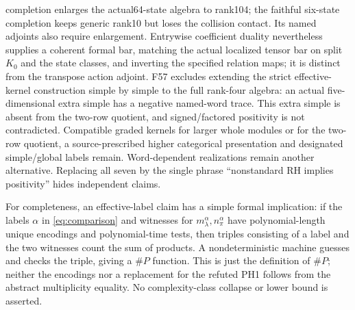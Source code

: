 \documentclass[11pt,a4paper]{article}
\theoremstyle{named}\newtheorem{finding}{Finding}[section]
\theoremstyle{definition}\newtheorem{definition}[finding]{Definition}
\theoremstyle{remark}\newtheorem{remark}[finding]{Remark}
\begin{document}
completion enlarges the actual64-state algebra to rank104; the faithful six-state completion keeps generic rank10 but loses the collision contact. Its named adjoints also require enlargement. Entrywise coefficient duality nevertheless supplies a coherent formal bar, matching the actual localized tensor bar on split $K_0$ and the state classes, and inverting the specified relation maps; it is distinct from the transpose action adjoint. F57 excludes extending the strict effective-kernel construction simple by simple to the full rank-four algebra: an actual five-dimensional extra simple has a negative named-word trace. This extra simple is absent from the two-row quotient, and signed/factored positivity is not contradicted. Compatible graded kernels for larger whole modules or for the two-row quotient, a source-prescribed higher categorical presentation and designated simple/global labels remain. Word-dependent realizations remain another alternative. Replacing all seven by the single phrase ``nonstandard RH implies positivity'' hides independent claims.

For completeness, an effective-label claim has a simple formal implication: if the labels $\alpha$ in \eqref{eq:comparison} and witnesses for $m_\lambda^\alpha,n_\pi^\alpha$ have polynomial-length unique encodings and polynomial-time tests, then triples consisting of a label and the two witnesses count the sum of products. A nondeterministic machine guesses and checks the triple, giving a \(\#P\) function. This is just the definition of \(\#P\); neither the encodings nor a replacement for the refuted PH1 follows from the abstract multiplicity equality. No complexity-class collapse or lower bound is asserted.
\end{document}
